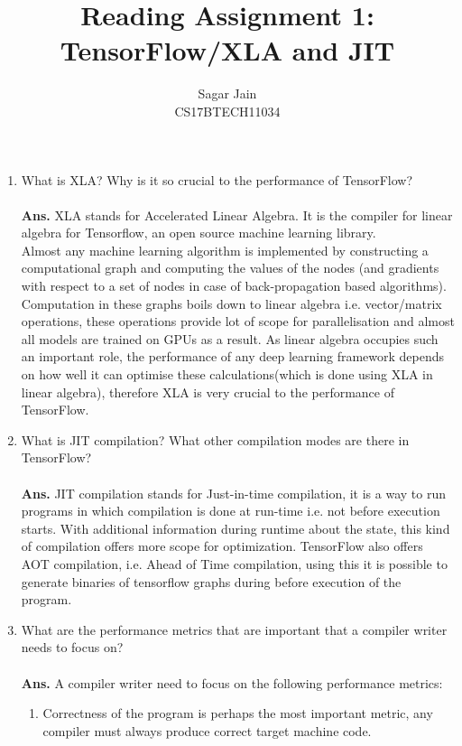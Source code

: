 \documentclass[12pt]{article}
\begin{document}
\title{Reading Assignment 1: TensorFlow/XLA and JIT}
\author{Sagar Jain\\CS17BTECH11034}
\maketitle

\begin{enumerate}
\item What is XLA? Why is it so crucial to the performance of TensorFlow?\\\\
\textbf{Ans.} XLA stands for Accelerated Linear Algebra. It is the compiler for linear algebra for Tensorflow, an open source machine learning library.\\
Almost any machine learning algorithm is implemented by constructing a computational graph and computing the values of the nodes (and gradients with respect to a set of nodes in case of back-propagation based algorithms). Computation in these graphs boils down to linear algebra i.e. vector/matrix operations, these operations provide lot of scope for parallelisation and almost all models are trained on GPUs as a result. As linear algebra occupies such an important role, the performance of any deep learning framework depends on how well it can optimise these calculations(which is done using XLA in linear algebra), therefore XLA is very crucial to the performance of TensorFlow.
\item What is JIT compilation? What other compilation modes are there in TensorFlow?\\\\
\textbf{Ans.} JIT compilation stands for Just-in-time compilation, it is a way to run programs in which compilation is done at run-time i.e. not before execution starts. With additional information during runtime about the state, this kind of compilation offers more scope for optimization.
TensorFlow also offers AOT compilation, i.e. Ahead of Time compilation, using this it is possible to generate binaries of tensorflow graphs during before execution of the program.
\item  What are the performance metrics that are important that a compiler writer needs to focus on?\\\\
\textbf{Ans.} A compiler writer need to focus on the following performance metrics:
\begin{enumerate}
\item Correctness of the program is perhaps the most important metric, any compiler must always produce correct target machine code.

\end{enumerate}
\end{enumerate}
\end{document}
